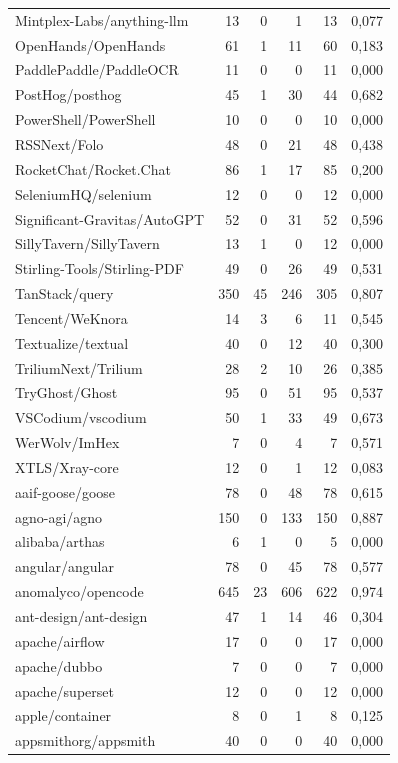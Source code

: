 \begin{tabular}{lrrrrr}
Mintplex-Labs/anything-llm & 13 & 0 & 1 & 13 & 0,077 \\
OpenHands/OpenHands & 61 & 1 & 11 & 60 & 0,183 \\
PaddlePaddle/PaddleOCR & 11 & 0 & 0 & 11 & 0,000 \\
PostHog/posthog & 45 & 1 & 30 & 44 & 0,682 \\
PowerShell/PowerShell & 10 & 0 & 0 & 10 & 0,000 \\
RSSNext/Folo & 48 & 0 & 21 & 48 & 0,438 \\
RocketChat/Rocket.Chat & 86 & 1 & 17 & 85 & 0,200 \\
SeleniumHQ/selenium & 12 & 0 & 0 & 12 & 0,000 \\
Significant-Gravitas/AutoGPT & 52 & 0 & 31 & 52 & 0,596 \\
SillyTavern/SillyTavern & 13 & 1 & 0 & 12 & 0,000 \\
Stirling-Tools/Stirling-PDF & 49 & 0 & 26 & 49 & 0,531 \\
TanStack/query & 350 & 45 & 246 & 305 & 0,807 \\
Tencent/WeKnora & 14 & 3 & 6 & 11 & 0,545 \\
Textualize/textual & 40 & 0 & 12 & 40 & 0,300 \\
TriliumNext/Trilium & 28 & 2 & 10 & 26 & 0,385 \\
TryGhost/Ghost & 95 & 0 & 51 & 95 & 0,537 \\
VSCodium/vscodium & 50 & 1 & 33 & 49 & 0,673 \\
WerWolv/ImHex & 7 & 0 & 4 & 7 & 0,571 \\
XTLS/Xray-core & 12 & 0 & 1 & 12 & 0,083 \\
aaif-goose/goose & 78 & 0 & 48 & 78 & 0,615 \\
agno-agi/agno & 150 & 0 & 133 & 150 & 0,887 \\
alibaba/arthas & 6 & 1 & 0 & 5 & 0,000 \\
angular/angular & 78 & 0 & 45 & 78 & 0,577 \\
anomalyco/opencode & 645 & 23 & 606 & 622 & 0,974 \\
ant-design/ant-design & 47 & 1 & 14 & 46 & 0,304 \\
apache/airflow & 17 & 0 & 0 & 17 & 0,000 \\
apache/dubbo & 7 & 0 & 0 & 7 & 0,000 \\
apache/superset & 12 & 0 & 0 & 12 & 0,000 \\
apple/container & 8 & 0 & 1 & 8 & 0,125 \\
appsmithorg/appsmith & 40 & 0 & 0 & 40 & 0,000 \\

\end{tabular}
